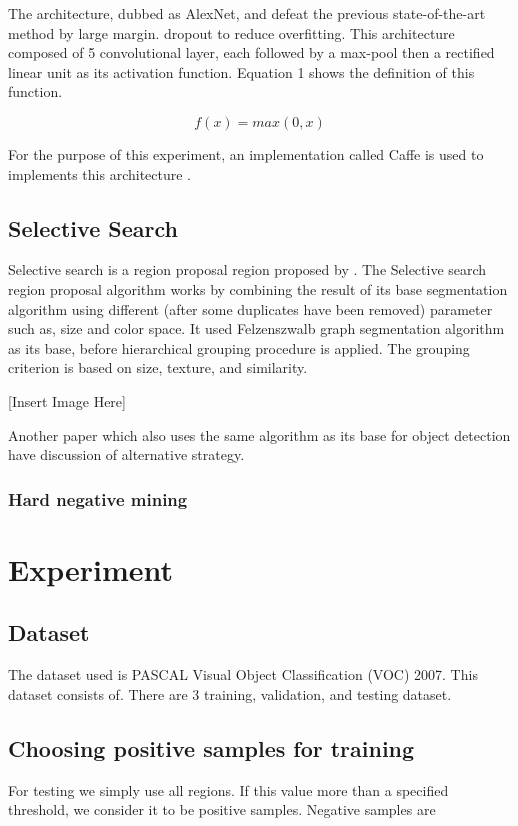 \documentclass[a4paper]{article}
\begin{document}
The architecture, dubbed as AlexNet, and defeat the previous state-of-the-art method by large margin. dropout to reduce overfitting.
This architecture composed of 5 convolutional layer, each followed by a max-pool then a rectified linear unit as its activation function. Equation 1 shows the definition of this function.

\begin{equation}
f(x) = max(0, x)
\end{equation}

For the purpose of this experiment, an implementation called Caffe is used to implements this architecture \cite{jia2013}.

\subsection{Selective Search}
Selective search is a region proposal region proposed by \cite{uva}. The 
Selective search region proposal algorithm works by combining the result of its base segmentation algorithm using different (after some duplicates have been removed) parameter such as, size and color space. It used Felzenszwalb graph segmentation algorithm as its base, before hierarchical grouping procedure is applied. The grouping criterion is based on size, texture, and similarity.

[Insert Image Here]

Another paper which also uses the same algorithm as its base for object detection have discussion of alternative strategy.

\subsubsection{Hard negative mining}

\section{Experiment}
\label{sec:experiment}

\subsection{Dataset}
The dataset used is PASCAL Visual Object Classification (VOC) 2007. This dataset consists of. There are 3 training, validation, and testing dataset.

\subsection{Choosing positive samples for training}
For testing we simply use all regions.
If this value more than a specified threshold, we consider it to be positive samples. Negative samples are 
\end{document}
